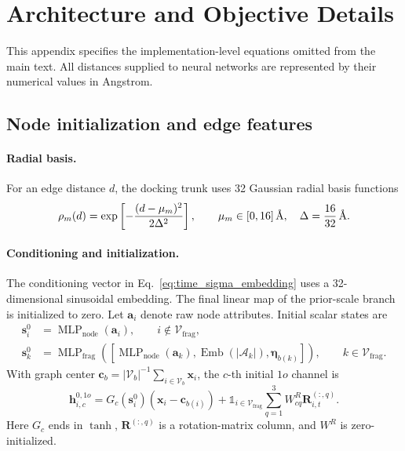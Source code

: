 \section{Architecture and Objective Details}
\label{app:architecture_details}

This appendix specifies the implementation-level equations omitted from the
main text. All distances supplied to neural networks are represented by their
numerical values in Angstrom.

\subsection{Node initialization and edge features}
\label{app:edge_features}

\paragraph{Radial basis.}
For an edge distance \(d\), the docking trunk uses 32 Gaussian radial basis
functions
\begin{equation}
    \rho_m(d)
    =
    \exp\left[-\frac{(d-\mu_m)^2}{2\Delta^2}\right],
    \qquad
    \mu_m\in[0,16]\,\text{\normalfont\AA},\quad
    \Delta=\frac{16}{32}\,\text{\normalfont\AA}.
    \label{eq:rbf}
\end{equation}

\paragraph{Conditioning and initialization.}
The conditioning vector in Eq.~\eqref{eq:time_sigma_embedding} uses a
32-dimensional sinusoidal embedding. The final linear map of the prior-scale
branch is initialized to zero. Let \(\mathbf{a}_i\) denote raw node
attributes. Initial scalar states are
\begin{align}
    \mathbf{s}^{0}_i
    &=
    \operatorname{MLP}_{\mathrm{node}}(\mathbf{a}_i),
    \qquad i\notin\mathcal{V}_{\mathrm{frag}},\\
    \mathbf{s}^{0}_k
    &=
    \operatorname{MLP}_{\mathrm{frag}}
    \left(
      \left[
      \operatorname{MLP}_{\mathrm{node}}(\mathbf{a}_k),
      \operatorname{Emb}(|\mathcal{A}_k|),
      \boldsymbol{\eta}_{b(k)}
      \right]
    \right),
    \qquad k\in\mathcal{V}_{\mathrm{frag}}.
    \label{eq:scalar_initialization}
\end{align}
With graph center
\(\mathbf{c}_b=|\mathcal{V}_b|^{-1}\sum_{i\in\mathcal{V}_b}\mathbf{x}_i\),
the \(c\)-th initial \(1o\) channel is
\begin{equation}
    \mathbf{h}^{0,1o}_{i,c}
    =
    G_c(\mathbf{s}^{0}_i)(\mathbf{x}_i-\mathbf{c}_{b(i)})
    +
    \mathbb{1}_{i\in\mathcal{V}_{\mathrm{frag}}}
    \sum_{q=1}^{3}W^{R}_{cq}\mathbf{R}_{i,t}^{(:,q)}.
    \label{eq:vector_initialization}
\end{equation}
Here \(G_c\) ends in \(\tanh\), \(\mathbf{R}^{(:,q)}\) is a rotation-matrix
column, and \(W^R\) is zero-initialized.

